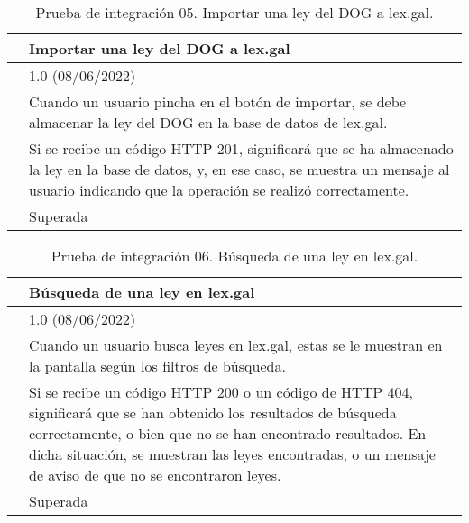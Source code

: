 \begin{table}[H]
\begin{center}
\begin{tabular}{|p{3cm}|p{10cm}|} \hline
\centering {\bf PI-05} & Importar una ley del DOG a lex.gal  \\ \hline\hline
\centering {\bf Versión} & 1.0 (08/06/2022) \\ \hline
\centering {\bf Descripción} & Cuando un usuario pincha en el botón de importar, se debe almacenar la ley del DOG en la base de datos de lex.gal. \\ \hline
\centering {\bf Criterio de aceptación} & Si se recibe un código HTTP 201, significará que se ha almacenado la ley en la base de datos, y, en ese caso, se muestra un mensaje al usuario indicando que la operación se realizó correctamente. \\ \hline
\centering {\bf Estado} & Superada \\ \hline
\end{tabular}
\caption{Prueba de integración 05. Importar una ley del DOG a lex.gal.}
\label{enlacePI5}
\end{center}
\end{table}

\begin{table}[H]
\begin{center}
\begin{tabular}{|p{3cm}|p{10cm}|} \hline
\centering {\bf PI-06} & Búsqueda de una ley en lex.gal  \\ \hline\hline
\centering {\bf Versión} & 1.0 (08/06/2022) \\ \hline
\centering {\bf Descripción} & Cuando un usuario busca leyes en lex.gal, estas se le muestran en la pantalla según los filtros de búsqueda. \\ \hline
\centering {\bf Criterio de aceptación} & Si se recibe un código HTTP 200 o un código de HTTP 404, significará que se han obtenido los resultados de búsqueda correctamente, o bien que no se han encontrado resultados. En dicha situación, se muestran las leyes encontradas, o un mensaje de aviso de que no se encontraron leyes. \\ \hline
\centering {\bf Estado} & Superada \\ \hline
\end{tabular}
\caption{Prueba de integración 06. Búsqueda de una ley en lex.gal.}
\label{enlacePI6}
\end{center}
\end{table}

